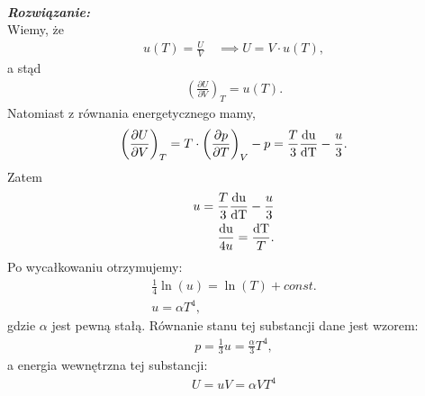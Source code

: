 \documentclass[11pt,a4paper]{article}
\newcounter{rozwiazanie}\newcommand{\rozwiazanie}[1][]{\addtocounter{rozwiazanie}{1} ~\\  {\bf \emph{Rozwiązanie: }} \\}
\begin{document}
\vspace{5mm}
\rozwiazanie
Wiemy, że
\begin{align}
u(T) = \frac{U}{V} \quad  \implies U = V \cdot u(T),
\end{align}
a stąd 
\begin{align}
\left( \frac{\partial U }{\partial V}\right)_T = u(T). \label{eq:part1}
\end{align}
Natomiast z równania energetycznego mamy,
\begin{align}
\left( \frac{\partial U }{\partial V}\right)_T  = T \cdot \left( \frac{\partial p }{\partial T}\right)_V - p = \frac{T}{3} \frac{\rm{d} u}{\rm{d} T}- \frac{u}{3}. \label{eq:part2}
\end{align}
Zatem 
\begin{align}
u = \frac{T}{3}\frac{\rm{d} u}{\rm{d} T}- \frac{u}{3}\\
\frac{\rm{d}u}{4 u} = \frac{\rm{d}T}{T}.
\end{align}
Po wycałkowaniu otrzymujemy:
\begin{align}
\frac{1}{4}\ln(u) = \ln(T) + const.\\
u = \alpha T^4,
\end{align}
gdzie $\alpha$ jest pewną stałą. 
Równanie stanu tej substancji dane jest wzorem:
\begin{align}
p = \frac{1}{3}u = \frac{\alpha}{3}T^4,
\end{align}
a energia wewnętrzna tej substancji:
\begin{align}
U = u V = \alpha V T^4
\end{align}
\end{document}

